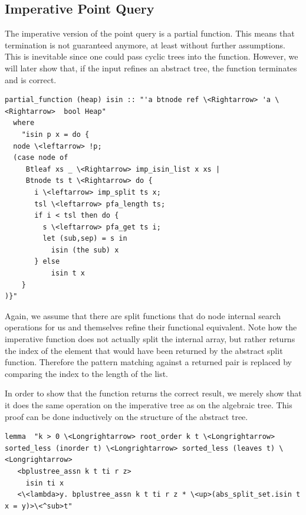 \documentclass[a4paper,UKenglish,cleveref, autoref, thm-restate]{lipics-v2021}
\begin{document}
\subsection{Imperative Point Query}
\label{sec:imperative_pq}

The imperative version of the point query is a partial function.
This means that termination is not guaranteed anymore,
at least without further assumptions.
This is inevitable since one could pass cyclic trees into the function.
However, we will later show that, if the input refines an abstract tree,
the function terminates and is correct.

\begin{lstlisting}[mathescape=true, language=Isabelle,label=lst:isin-imp-def]
partial_function (heap) isin :: "'a btnode ref \<Rightarrow> 'a \<Rightarrow>  bool Heap"
  where
    "isin p x = do {
  node \<leftarrow> !p;
  (case node of
     Btleaf xs _ \<Rightarrow> imp_isin_list x xs |
     Btnode ts t \<Rightarrow> do {
       i \<leftarrow> imp_split ts x;
       tsl \<leftarrow> pfa_length ts;
       if i < tsl then do {
         s \<leftarrow> pfa_get ts i;
         let (sub,sep) = s in
           isin (the sub) x
       } else
           isin t x
    }
)}"
\end{lstlisting}

Again, we assume that there are split functions that do node internal search operations for us
and themselves refine their functional equivalent.
Note how the imperative function does not actually split
the internal array, but rather returns the index of the element
that would have been returned by the abstract split function.
Therefore the pattern matching against a returned pair
is replaced by comparing the index to the length of the list.

In order to show that the function returns the correct result,
we merely show that it does the same operation on the imperative tree
as on the algebraic tree.
This proof can be done inductively on the structure of the abstract tree.

\begin{lstlisting}[mathescape=true, language=Isabelle,label=lst:isin-refines]
lemma  "k > 0 \<Longrightarrow> root_order k t \<Longrightarrow> sorted_less (inorder t) \<Longrightarrow> sorted_less (leaves t) \<Longrightarrow>
   <bplustree_assn k t ti r z>
     isin ti x
   <\<lambda>y. bplustree_assn k t ti r z * \<up>(abs_split_set.isin t x = y)>\<^sub>t"
\end{lstlisting}
\end{document}
